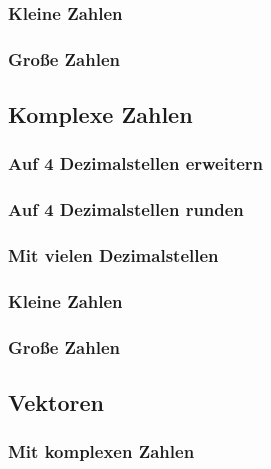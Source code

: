 \subsubsection{Kleine Zahlen}

\subsubsection{Große Zahlen}

\subsection{Komplexe Zahlen}

\subsubsection{Auf 4 Dezimalstellen erweitern}

\subsubsection{Auf 4 Dezimalstellen runden}

\subsubsection{Mit vielen Dezimalstellen}

\subsubsection{Kleine Zahlen}

\subsubsection{Große Zahlen}

\subsection{Vektoren}

\subsubsection{Mit komplexen Zahlen}

